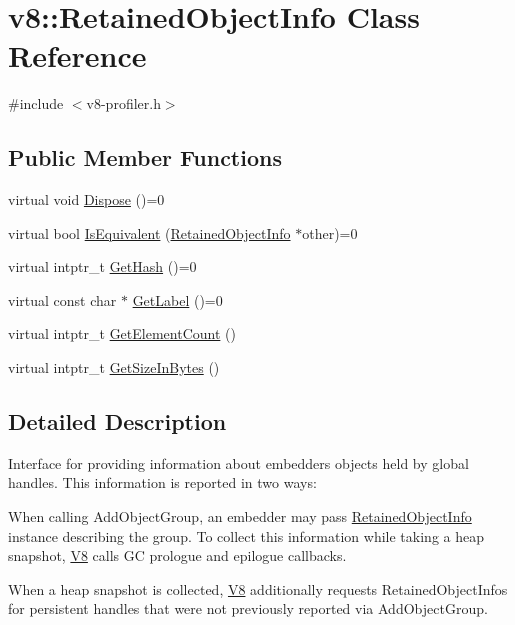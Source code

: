 \hypertarget{classv8_1_1_retained_object_info}{}\section{v8\+:\+:Retained\+Object\+Info Class Reference}
\label{classv8_1_1_retained_object_info}


{\ttfamily \#include $<$v8-\/profiler.\+h$>$}

\subsection*{Public Member Functions}
\begin{DoxyCompactItemize}
\item 
virtual void \hyperlink{classv8_1_1_retained_object_info_a5011203f7c5949049ba36b8059f03eca}{Dispose} ()=0
\item 
virtual bool \hyperlink{classv8_1_1_retained_object_info_a286103bb076c85415919c86b1838c990}{Is\+Equivalent} (\hyperlink{classv8_1_1_retained_object_info}{Retained\+Object\+Info} $\ast$other)=0
\item 
virtual intptr\+\_\+t \hyperlink{classv8_1_1_retained_object_info_a6fdbfa242b95615e63f08433419c8066}{Get\+Hash} ()=0
\item 
virtual const char $\ast$ \hyperlink{classv8_1_1_retained_object_info_ad19106fc7f0499fd45005077551d54c0}{Get\+Label} ()=0
\item 
virtual intptr\+\_\+t \hyperlink{classv8_1_1_retained_object_info_ae6865597469bc7d28bd8ec71b4b890bd}{Get\+Element\+Count} ()
\item 
virtual intptr\+\_\+t \hyperlink{classv8_1_1_retained_object_info_a1a899eed0b1f6e046edc3c7a7c08aa8c}{Get\+Size\+In\+Bytes} ()
\end{DoxyCompactItemize}


\subsection{Detailed Description}
Interface for providing information about embedder\textquotesingle{}s objects held by global handles. This information is reported in two ways\+:


\begin{DoxyEnumerate}
\item When calling Add\+Object\+Group, an embedder may pass \hyperlink{classv8_1_1_retained_object_info}{Retained\+Object\+Info} instance describing the group. To collect this information while taking a heap snapshot, \hyperlink{classv8_1_1_v8}{V8} calls G\+C prologue and epilogue callbacks.
\item When a heap snapshot is collected, \hyperlink{classv8_1_1_v8}{V8} additionally requests Retained\+Object\+Infos for persistent handles that were not previously reported via Add\+Object\+Group.
\end{DoxyEnumerate}

